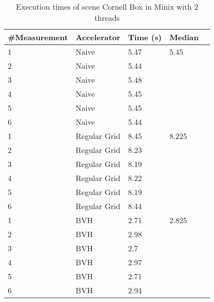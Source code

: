 \begin{table}[H]
	\small
	\begin{tabular}{|l|l|l|l|l|}
		\hline
		\#Measurement & Accelerator & Time (s) & Median \\ \hline
		1 & Naive & 5.47 & 5.45 \\ \hline
		2 & Naive & 5.44 & \\ \hline
		3 & Naive & 5.48 & \\ \hline
		4 & Naive & 5.45 & \\ \hline
		5 & Naive & 5.45 & \\ \hline
		6 & Naive & 5.44 & \\ \hline
		1 & Regular Grid & 8.45 & 8.225 \\ \hline
		2 & Regular Grid & 8.23 & \\ \hline
		3 & Regular Grid & 8.19 & \\ \hline
		4 & Regular Grid & 8.22 & \\ \hline
		5 & Regular Grid & 8.19 & \\ \hline
		6 & Regular Grid & 8.44 & \\ \hline
		1 & BVH & 2.71 & 2.825 \\ \hline
		2 & BVH & 2.98 & \\ \hline
		3 & BVH & 2.7 & \\ \hline
		4 & BVH & 2.97 & \\ \hline
		5 & BVH & 2.71 & \\ \hline
		6 & BVH & 2.94 & \\ \hline
	\end{tabular}
	\label{Time}
	\caption{Execution times of scene Cornell Box in Minix with 2 threads}
\end{table}

